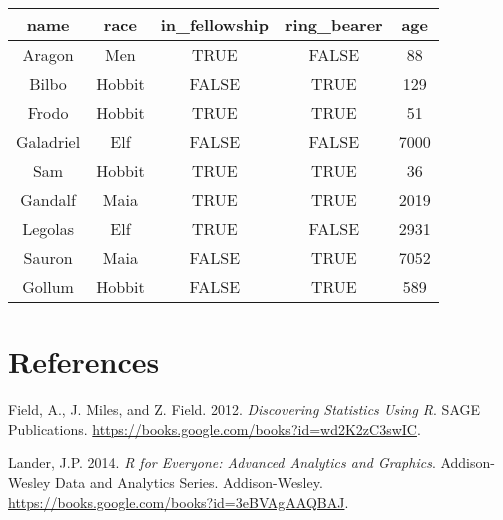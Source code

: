 \documentclass[]{article}
\begin{document}
\begin{longtable}[]{@{}ccccc@{}}
\toprule
name & race & in\_fellowship & ring\_bearer & age\tabularnewline
\midrule
\endhead
Aragon & Men & TRUE & FALSE & 88\tabularnewline
Bilbo & Hobbit & FALSE & TRUE & 129\tabularnewline
Frodo & Hobbit & TRUE & TRUE & 51\tabularnewline
Galadriel & Elf & FALSE & FALSE & 7000\tabularnewline
Sam & Hobbit & TRUE & TRUE & 36\tabularnewline
Gandalf & Maia & TRUE & TRUE & 2019\tabularnewline
Legolas & Elf & TRUE & FALSE & 2931\tabularnewline
Sauron & Maia & FALSE & TRUE & 7052\tabularnewline
Gollum & Hobbit & FALSE & TRUE & 589\tabularnewline
\bottomrule
\end{longtable}

\section*{References}\label{references}

\hypertarget{refs}{}
\hypertarget{ref-field2012discovering}{}
Field, A., J. Miles, and Z. Field. 2012. \emph{Discovering Statistics
Using R}. SAGE Publications.
\url{https://books.google.com/books?id=wd2K2zC3swIC}.

\hypertarget{ref-lander2014r}{}
Lander, J.P. 2014. \emph{R for Everyone: Advanced Analytics and
Graphics}. Addison-Wesley Data and Analytics Series. Addison-Wesley.
\url{https://books.google.com/books?id=3eBVAgAAQBAJ}.
\end{document}
